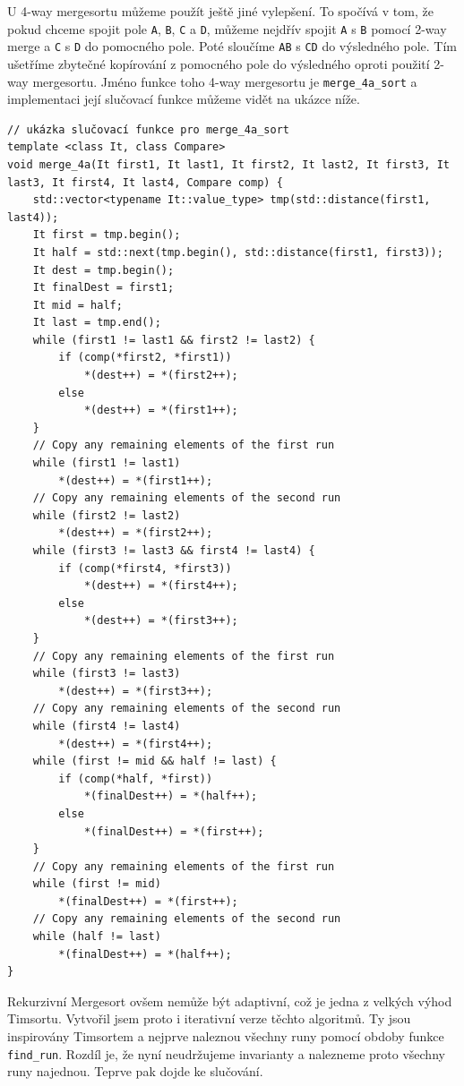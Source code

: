 \documentclass[thesis=B,czech]{FITthesis}[2019/12/23]
\begin{document}
U 4-way mergesortu můžeme použít ještě jiné vylepšení. To spočívá v tom, že pokud chceme spojit pole \texttt{A}, \texttt{B}, \texttt{C} a \texttt{D}, můžeme nejdřív spojit \texttt{A} s \texttt{B} pomocí 2-way merge a \texttt{C} s \texttt{D} do pomocného pole. Poté sloučíme \texttt{AB} s \texttt{CD} do výsledného pole. Tím ušetříme zbytečné kopírování z pomocného pole do výsledného oproti použití 2-way mergesortu. Jméno funkce toho 4-way mergesortu je \texttt{merge\_4a\_sort} a implementaci její slučovací funkce můžeme vidět na ukázce níže.

\begin{verbatim}
// ukázka slučovací funkce pro merge_4a_sort
template <class It, class Compare>
void merge_4a(It first1, It last1, It first2, It last2, It first3, It last3, It first4, It last4, Compare comp) {
    std::vector<typename It::value_type> tmp(std::distance(first1, last4));
    It first = tmp.begin();
    It half = std::next(tmp.begin(), std::distance(first1, first3));
    It dest = tmp.begin();
    It finalDest = first1;
    It mid = half;
    It last = tmp.end();
    while (first1 != last1 && first2 != last2) {
        if (comp(*first2, *first1))
            *(dest++) = *(first2++);
        else
            *(dest++) = *(first1++);
    }
    // Copy any remaining elements of the first run
    while (first1 != last1)
        *(dest++) = *(first1++);
    // Copy any remaining elements of the second run
    while (first2 != last2)
        *(dest++) = *(first2++);
    while (first3 != last3 && first4 != last4) {
        if (comp(*first4, *first3))
            *(dest++) = *(first4++);
        else
            *(dest++) = *(first3++);
    }
    // Copy any remaining elements of the first run
    while (first3 != last3)
        *(dest++) = *(first3++);
    // Copy any remaining elements of the second run
    while (first4 != last4)
        *(dest++) = *(first4++);
    while (first != mid && half != last) {
        if (comp(*half, *first))
            *(finalDest++) = *(half++);
        else
            *(finalDest++) = *(first++);
    }
    // Copy any remaining elements of the first run
    while (first != mid)
        *(finalDest++) = *(first++);
    // Copy any remaining elements of the second run
    while (half != last)
        *(finalDest++) = *(half++);
}

\end{verbatim}

Rekurzivní Mergesort ovšem nemůže být adaptivní, což je jedna z velkých výhod Timsortu. Vytvořil jsem proto i iterativní verze těchto algoritmů. Ty jsou inspirovány Timsortem a nejprve naleznou všechny runy pomocí obdoby funkce \texttt{find\_run}. Rozdíl je, že nyní neudržujeme invarianty a nalezneme proto všechny runy najednou. Teprve pak dojde ke slučování. 
\end{document}
